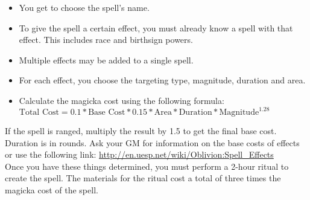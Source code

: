 \begin{itemize}
	\item You get to choose the spell's name.
	\item To give the spell a certain effect, you must already know a spell with that effect. This includes race and birthsign powers.
	\item Multiple effects may be added to a single spell.
	\item For each effect, you choose the targeting type, magnitude, duration and area.
	\item Calculate the magicka cost using the following formula: $\text{Total Cost}=0.1*\text{Base Cost}*0.15*\text{Area}*\text{Duration}*\text{Magnitude}^{1.28}$
\end{itemize}

If the spell is ranged, multiply the result by 1.5 to get the final base cost. Duration is in rounds. Ask your GM for information on the base costs of effects or use the following link: \url{http://en.uesp.net/wiki/Oblivion:Spell_Effects}\\

Once you have these things determined, you must perform a 2-hour ritual to create the spell. The materials for the ritual cost a total of three times the magicka cost of the spell.
